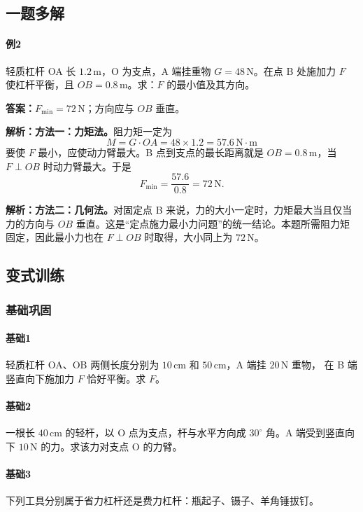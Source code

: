 \documentclass[12pt,a4paper]{ctexart}
\newcommand{\Ans}[1]{\par\noindent\textbf{答案：}#1\par}
\newcommand{\Sol}[1]{\par\noindent\textbf{解析：}#1\par}
\begin{document}
\subsection{一题多解}
\paragraph{例2}
轻质杠杆 OA 长 $1.2\,\mathrm{m}$，O 为支点，A 端挂重物 $G=48\,\mathrm{N}$。在点 B 处施加力
$F$ 使杠杆平衡，且 $OB=0.8\,\mathrm{m}$。求：$F$ 的最小值及其方向。

\Ans{$F_{\min}=72\,\mathrm{N}$；方向应与 $OB$ 垂直。}

\Sol{\textbf{方法一：力矩法。}阻力矩一定为
\[
M=G\cdot OA =48\times 1.2=57.6\,\mathrm{N\cdot m}
\]
要使 $F$ 最小，应使动力臂最大。B 点到支点的最长距离就是 $OB=0.8\,\mathrm{m}$，当
$F\perp OB$ 时动力臂最大。于是
\[
F_{\min}=\frac{57.6}{0.8}=72\,\mathrm{N}.
\]}

\Sol{\textbf{方法二：几何法。}对固定点 B 来说，力的大小一定时，力矩最大当且仅当力的方向与
$OB$ 垂直。这是“定点施力最小力问题”的统一结论。本题所需阻力矩固定，因此最小力也在
$F\perp OB$ 时取得，大小同上为 $72\,\mathrm{N}$。}

\subsection{变式训练}

\subsubsection*{基础巩固}
\paragraph{基础1}
轻质杠杆 OA、OB 两侧长度分别为 $10\,\mathrm{cm}$ 和 $50\,\mathrm{cm}$，A 端挂 $20\,\mathrm{N}$ 重物，
在 B 端竖直向下施加力 $F$ 恰好平衡。求 $F$。

\paragraph{基础2}
一根长 $40\,\mathrm{cm}$ 的轻杆，以 O 点为支点，杆与水平方向成 $30^\circ$ 角。A 端受到竖直向下
$10\,\mathrm{N}$ 的力。求该力对支点 O 的力臂。

\paragraph{基础3}
下列工具分别属于省力杠杆还是费力杠杆：瓶起子、镊子、羊角锤拔钉。
\end{document}
